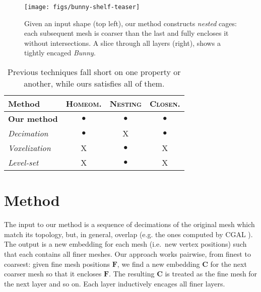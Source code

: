\documentclass{cgyrf15}
\newcommand{\ra}[1]{\renewcommand{\arraystretch}{#1}}
\newcommand{\NO}{{\color{red}\textsf{X}}}
\newcommand{\YES}{$\bullet$}
\begin{document}
\begin{figure}[t]
  \vspace{-0.1cm}
  \texttt{[image: figs/bunny-shelf-teaser]} 
  \vspace*{-2em}
  \caption{Given an input shape (top left), our method constructs \emph{nested} cages:
each subsequent mesh is coarser than the last and fully encloses it without
intersections. A slice through all layers (right), shows a tightly
encaged \emph{Bunny}. 
  }
  \label{fig:bunny-shelf-teaser}
\end{figure}

\begin{table}
\centering
\ra{1.0}
\setlength{\tabcolsep}{5.5pt}
\begin{tabularx}{\linewidth}{X c c c}
\rowcolor{white}
\toprule
Method               & \textsc{Homeom.} & \textsc{Nesting}& \textsc{Closen.} \\
\midrule                                                                       
\textbf{Our method}  & \YES                  & \YES            & \YES           \\
\emph{Decimation}                                                               
                     & \YES                  & \NO             & \YES           \\
\emph{Voxelization}                                                             
                     & \NO                   & \YES            & \NO            \\
\emph{Level-set}                                                                
                     & \NO                   & \YES            & \NO            \\
\bottomrule
\end{tabularx}
\vspace*{-1em}
\caption{
Previous techniques fall short
on one property or another, while ours satisfies all of them.}
\label{tab:feature-chart}
\end{table}

\section{Method}

The input to our method is a sequence of decimations of the original mesh which
match its topology, but, in general, overlap (e.g. the ones computed by CGAL
\cite{cgal}). The output is a new embedding for each mesh (i.e.\ new vertex
positions) such that each contains all finer meshes. Our approach works
pairwise, from finest to coarsest: given fine mesh positions $\mathbf{F}$, we
find a new embedding $\mathbf{C}$ for the next coarser mesh so that it encloses
$\mathbf{F}$. The resulting $\mathbf{C}$ is treated as the fine mesh for the
next layer and so on. Each layer inductively encages all finer layers.
\end{document}
